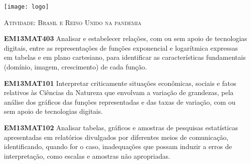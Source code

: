 \documentclass[10 pt,usenames,dvipsnames, oneside]{article}
\begin{document}
\begin{center}
  \begin{minipage}[l]{3cm}
\texttt{[image: logo]}    
\end{minipage}\hfill
\begin{minipage}[r]{.8\textwidth}
 {\Large \scshape Atividade: Brasil e Reino Unido na pandemia}  
\end{minipage}
\end{center}
\vspace{.2cm}

\ifdefined\prof
\begin{objetivos}
\item \textbf{EM13MAT403} Analisar e estabelecer relações, com ou sem apoio de tecnologias digitais, entre as representações de funções exponencial e logarítmica expressas em tabelas e em plano cartesiano, para identificar as características fundamentais (domínio, imagem, crescimento) de cada função.
\item \textbf{EM13MAT101} Interpretar criticamente situações econômicas, sociais e fatos relativos às Ciências da Natureza que envolvam a variação de grandezas, pela análise dos gráficos das funções representadas e das taxas de variação, com ou sem apoio de tecnologias digitais.

\item \textbf{EM13MAT102} Analisar tabelas, gráficos e amostras de pesquisas estatísticas apresentadas em relatórios divulgados por diferentes meios de comunicação, identificando, quando for o caso, inadequações que possam induzir a erros de interpretação, como escalas e amostras não apropriadas.
\end{objetivos}
\end{document}
